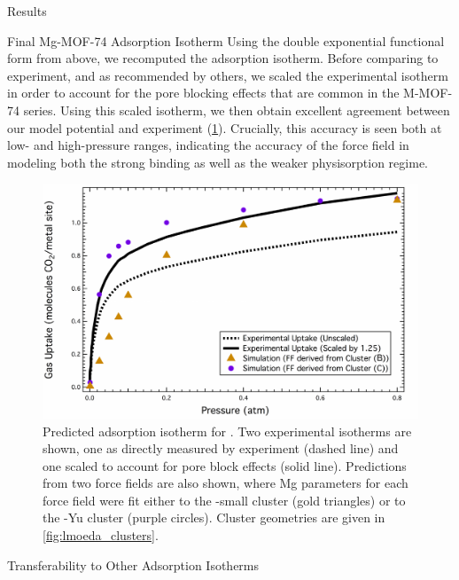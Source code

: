 \begin{section}{Results}
\begin{subsection}{Final Mg-MOF-74 {\co} Adsorption Isotherm}
Using the double exponential functional form from above, we recomputed the
\mgmof \co adsorption isotherm. Before comparing to experiment, and as
recommended by others,\cite{Haldoupis2015a} we scaled the experimental
isotherm in order to account for the pore blocking effects that are common in
the M-MOF-74 series. Using this scaled isotherm, we then obtain excellent
agreement between our model potential and experiment
(\cref{fig:lmoeda-isotherm}). Crucially, this accuracy is seen both at low-
and high-pressure ranges, indicating the accuracy of the force field in
modeling both the
strong  binding as well as the weaker physisorption regime.



    \begin{figure}
    \centering
    \includegraphics[width=1.0\textwidth]{lmoeda/mgmof_isotherm.pdf}
    \caption[Predicted \co Adsorption Isotherm for \mgmof]
{Predicted \co adsorption isotherm for \mgmof. Two experimental isotherms are
shown, one as directly measured by experiment (dashed line) and one scaled to
account for pore block effects (solid line). Predictions from two force fields
are also shown, where Mg parameters for each force field were fit either to
the \mgmof-small cluster (gold triangles) or to the \mgmof-Yu cluster (purple
circles). Cluster geometries are given in \cref{fig:lmoeda_clusters}.
            }
    \label{fig:lmoeda-isotherm}
    \end{figure}

\end{subsection}
\begin{subsection}{Transferability to Other Adsorption Isotherms}


\end{subsection}
\end{section}
